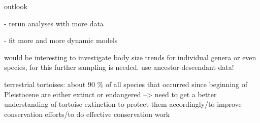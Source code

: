 


outlook

- rerun analyses with more data

- fit more and more dynamic models \citep{Hunt2015}



would be interesting to investigate body size trends for individual genera or even species, for this further sampling is needed. use ancestor-descendant data! 

terrestrial tortoises: about 90 \% of all species that occurred since beginning of Pleistocene are either extinct or endangered --> need to get a better understanding of tortoise extinction to protect them accordingly/to improve conservation efforts/to do effective conservation work
